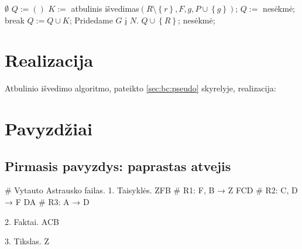 \begin{algorithmic}[1]
     \label{bc:pseudo:goal_in_facts}
      \State \Return $\emptyset$ \label{bc:pseudo:emptyset}
    \Else
       \label{bc:pseudo:rule_iter}
        \State $Q := \left( \right)$ \label{bc:pseudo:initial_Q}
         \label{bc:pseudo:premise_iter}
          \State $K := $ atbulinis išvedimas$(%
            R\setminus \left\{ r \right\}, F, g,%
            P \cup \left\{ g \right\})$; \label{bc:pseudo:recursion}
           \label{bc:pseudo:rule:fail}
            \State $Q :=$ nesėkmė;
            \State break
          \Else \label{bc:pseudo:rule:success}
            \State $Q := Q \cup K$;
          \EndIf
           \label{bc:pseudo:success}
            \State Pridedame $G$ į $N$. \label{bc:pseudo:add_fact}
            \State \Return $Q \cup \left\{ R \right\}$;%
              \label{bc:pseudo:return_succ}
          \EndIf
        \EndFor
      \EndFor
      \State \Return nesėkmė; \label{bc:pseudo:failure}
    \EndIf
  \EndFunction
\end{algorithmic}

\section{Realizacija}

Atbulinio išvedimo algoritmo, pateikto \ref{sec:bc:pseudo}
skyrelyje, realizacija:


\section{Pavyzdžiai}

\subsection{Pirmasis pavyzdys: paprastas atvejis}

\begin{pythonaienv}[bc]
# Vytauto Astrausko failas.
1. Taisyklės.
ZFB                                     # R1: F, B → Z
FCD                                     # R2: C, D → F
DA                                      # R3: A → D

2. Faktai.
ACB

3. Tikslas.
Z
\end{pythonaienv}

